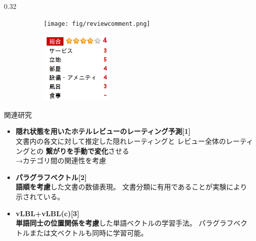 \documentclass[8pt,unicode]{beamer}
\newcommand{\columnscale}{0.32}
\newcommand{\itemtitle}[1]{\textbf{#1} \\}
\newcommand{\arrow}{{\color{ttiblue} →}\hspace{1ex}}
\newcommand{\good}[1]{\textbf{\color{orange} #1}}
\newcommand{\bad}[1]{\textbf{\color{blue} #1}}
\begin{document}
\begin{frame}{}
\begin{columns}[t]
\begin{column}{\columnscale\textwidth}
  \vspace{-1em} %
  \begin{figure}
    \caption{例. カテゴリ毎のラベルが付いた文書（商品レビュー）}
    \begin{subfigure}{0.52\textwidth}
      \texttt{[image: fig/reviewcomment.png]}
    \end{subfigure}
    \begin{subfigure}{0.32\textwidth}
      \includegraphics[width=\textwidth]{fig/reviewpoints.png}
    \end{subfigure}
  \end{figure}

  \begin{block}{関連研究}
    \begin{itemize}
      \item \itemtitle{隠れ状態を用いたホテルレビューのレーティング予測[1]}
        文書内の各文に対して推定した隠れレーティングと
        レビュー全体のレーティングとの\bad{繋がりを手動で変化}させる \\
        \arrow カテゴリ間の関連性を考慮
      \item \itemtitle{パラグラフベクトル[2]}
        \good{語順を考慮}した文書の数値表現。
        文書分類に有用であることが実験により示されている。
      \item \itemtitle{vLBL+vLBL(c)[3]}
        \good{単語同士の位置関係を考慮}した単語ベクトルの学習手法。
        パラグラフベクトルまたは文ベクトルも同時に学習可能。
    \end{itemize}
  \end{block}


\end{column}
\end{columns}
\end{frame}
\end{document}
